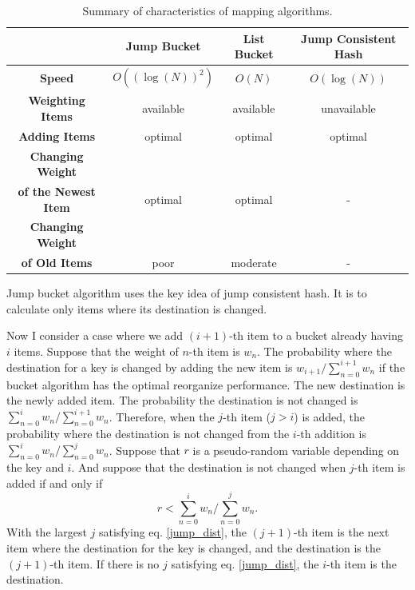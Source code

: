 \documentclass[a4paper,11pt]{article}
\begin{document}
\begin{table}[tbp]
\begin{tabular}{|c|c|c|c|} \hline
& {\bf Jump Bucket} & {\bf List Bucket} & {\bf Jump Consistent Hash} \\\hline
{\bf Speed}           & $O((\log(N))^2)$ & $O(N)$      & $O(\log(N))$     \\\hline
{\bf Weighting Items} & available        & available   & unavailable     \\\hline
{\bf Adding Items}    & optimal          & optimal     & optimal          \\\hline
{\bf Changing Weight} &&& \\
{\bf of the Newest Item}& optimal & optimal & - \\\hline
{\bf Changing Weight} &&& \\
{\bf of Old Items}& poor & moderate & - \\\hline
\end{tabular}
\caption{Summary of characteristics of mapping algorithms.}
\label{table_algorithms}
\end{table}

Jump bucket algorithm uses the key idea of jump consistent hash.
It is to calculate only items where its destination is changed.

Now I consider a case where we add $(i+1)$-th item to a bucket already having $i$ items.
Suppose that the weight of $n$-th item is $w_n$.
The probability where the destination for a key is changed by adding the new item is
$w_{i+1} / \sum_{n=0}^{i+1} w_n$ if the bucket algorithm has the optimal reorganize performance.
The new destination is the newly added item.
The probability the destination is not changed is $\sum_{n=0}^i w_n / \sum_{n=0}^{i+1} w_n$.
Therefore, when the $j$-th item ($j > i$) is added, the probability where the destination is not changed from the $i$-th addition is $\sum_{n=0}^i w_n / \sum_{n=0}^j w_n$.
Suppose that $r$ is a pseudo-random variable depending on the key and $i$.
And suppose that the destination is not changed when $j$-th item is added if and only if
\begin{equation}
r < \sum_{n=0}^i w_n \bigg/ \sum_{n=0}^j w_n. \label{jump_dist}
\end{equation}
With the largest $j$ satisfying eq. \eqref{jump_dist}, the $(j+1)$-th item is the next item where the destination for the key is changed, and the destination is the $(j+1)$-th item.
If there is no $j$ satisfying eq. \eqref{jump_dist}, the $i$-th item is the destination.
\end{document}
